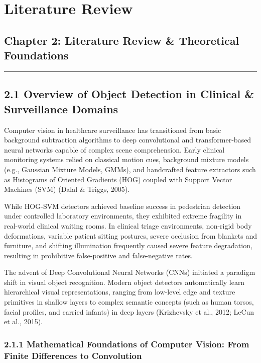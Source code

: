 \chapter{Literature Review}\label{literature-review}

\section{Chapter 2: Literature Review \& Theoretical
Foundations}\label{chapter-2-literature-review-theoretical-foundations}

\begin{center}\rule{0.5\linewidth}{0.5pt}\end{center}

\section{2.1 Overview of Object Detection in Clinical \& Surveillance
Domains}\label{overview-of-object-detection-in-clinical-surveillance-domains}

Computer vision in healthcare surveillance has transitioned from basic
background subtraction algorithms to deep convolutional and
transformer-based neural networks capable of complex scene
comprehension. Early clinical monitoring systems relied on classical
motion cues, background mixture models (e.g., Gaussian Mixture Models,
GMMs), and handcrafted feature extractors such as Histograms of Oriented
Gradients (HOG) coupled with Support Vector Machines (SVM) (Dalal \&
Triggs, 2005).

While HOG-SVM detectors achieved baseline success in pedestrian
detection under controlled laboratory environments, they exhibited
extreme fragility in real-world clinical waiting rooms. In clinical
triage environments, non-rigid body deformations, variable patient
sitting postures, severe occlusion from blankets and furniture, and
shifting illumination frequently caused severe feature degradation,
resulting in prohibitive false-positive and false-negative rates.

The advent of Deep Convolutional Neural Networks (CNNs) initiated a
paradigm shift in visual object recognition. Modern object detectors
automatically learn hierarchical visual representations, ranging from
low-level edge and texture primitives in shallow layers to complex
semantic concepts (such as human torsos, facial profiles, and carried
infants) in deep layers (Krizhevsky et al., 2012; LeCun et al., 2015).

\subsection{2.1.1 Mathematical Foundations of Computer Vision: From
Finite Differences to
Convolution}\label{mathematical-foundations-of-computer-vision-from-finite-differences-to-convolution}

